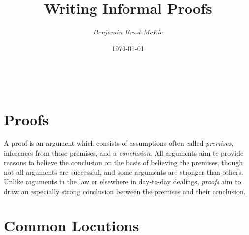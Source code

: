 \documentclass[a4paper, 11pt]{article} %
\title{\textbf{Writing Informal Proofs}} %
\author{\em Benjamin Brast-McKie} %
\date{\today\vspace{-0pt}} %
\makeatletter
\renewcommand{\maketitle}{ %
\begin{flushright} %
{\LARGE\@title} %

\vspace{10pt} %

{\@author} %
\\\@date %

\vspace{30pt} %
\end{flushright}
}
\makeatother
\begin{document}
\maketitle %

\thispagestyle{empty}



\section*{Proofs}

A proof is an argument which consists of assumptions often called \textit{premises}, inferences from those premises, and a \textit{conclusion}.
All arguments aim to provide reasons to believe the conclusion on the basis of believing the premises, though not all arguments are successful, and some arguments are stronger than others.
Unlike arguments in the law or elsewhere in day-to-day dealings, \textit{proofs} aim to draw an especially strong conclusion between the premises and their conclusion.

\section*{Common Locutions}
\end{document}
